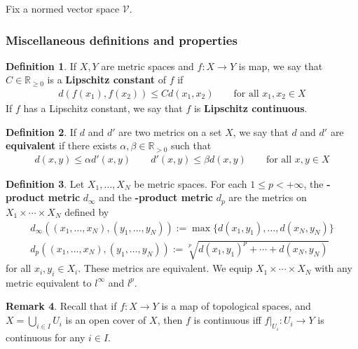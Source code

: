 \documentclass[12pt,b5paper,notitlepage]{article}
\theoremstyle{definition}
\newtheorem{df}{Definition}[subsection]
\newtheorem{rem}[df]{Remark}
\theoremstyle{plain}
\newcommand{\mc}{\mathcal}
\newcommand{\Rbb}{\mathbb R}
\numberwithin{equation}{section}
\begin{document}
Fix a normed vector space $\mc V$.

\subsubsection{Miscellaneous definitions and properties}


\begin{df}
If $X,Y$ are metric spaces and $f:X\rightarrow Y$ is map, we say that $C\in\Rbb_{\geq0}$ is a \textbf{Lipschitz constant}  of $f$ if
\begin{align*}
d(f(x_1),f(x_2))\leq Cd(x_1,x_2)\qquad\text{for all }x_1,x_2\in X
\end{align*}
If $f$ has a Lipschitz constant, we say that $f$ is \textbf{Lipschitz continuous}. 
\end{df}


\begin{df}
If $d$ and $d'$ are two metrics on a set $X$, we say that $d$ and $d'$ are \textbf{equivalent}  if there exists $\alpha,\beta\in\Rbb_{>0}$ such that
\begin{align*}
d(x,y)\leq \alpha d'(x,y)\qquad d'(x,y)\leq\beta d(x,y)\qquad\text{for all }x,y\in X
\end{align*}
\end{df}

\begin{df}\label{lb33}
Let $X_1,\dots,X_N$ be metric spaces. For each $1\leq p<+\infty$, the \textbf{-product metric} $d_\infty$  and the \textbf{-product metric}  $d_p$ are the metrics on $X_1\times\cdots\times X_N$ defined by
\begin{gather*}
d_\infty((x_1,\dots,x_N),(y_1,\dots,y_N)):=\max\{d(x_1,y_1),\dots,d(x_N,y_N)\}\\
d_p((x_1,\dots,x_N),(y_1,\dots,y_N)):=\sqrt[p]{d(x_1,y_1)^p+\cdots+d(x_N,y_N)}
\end{gather*}
for all $x_i,y_i\in X_i$. These metrics are equivalent. We equip $X_1\times\cdots\times X_N$ with any metric equivalent to $l^\infty$ and $l^p$.
\end{df}

\begin{rem}\label{lb34}
Recall that if $f:X\rightarrow Y$ is a map of topological spaces, and $X=\bigcup_{i\in I} U_i$ is an open cover of $X$, then $f$ is continuous iff $f|_{U_i}:U_i\rightarrow Y$ is continuous for any $i\in I$.
\end{rem}
\end{document}
